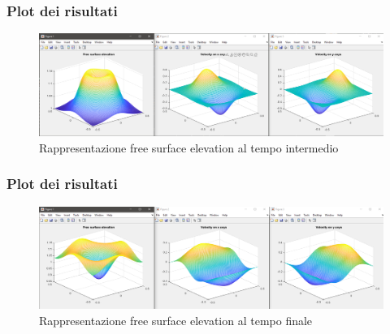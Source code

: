 \documentclass{beamer}
\begin{document}
\begin{frame}
	\frametitle{Plot dei risultati }
	\begin{figure}
	\includegraphics[width=1.0\linewidth]{test_2_cpu_matrice_120_120_0003_0000}
	\caption{Rappresentazione free surface elevation al tempo intermedio}
	\label{fig:Rappresentazione free surface elevation al tempo intermedio}

	\end{figure}
\end{frame}
\begin{frame}
	\frametitle{Plot dei risultati }
	\begin{figure}
	\includegraphics[width=1.0\linewidth]{test_2_cpu_matrice_120_120_0008_0000}
	\caption{Rappresentazione free surface elevation al tempo finale}
	\label{fig:Rappresentazione free surface elevation al tempo finale}
	\end{figure}
\end{frame}
\end{document}
